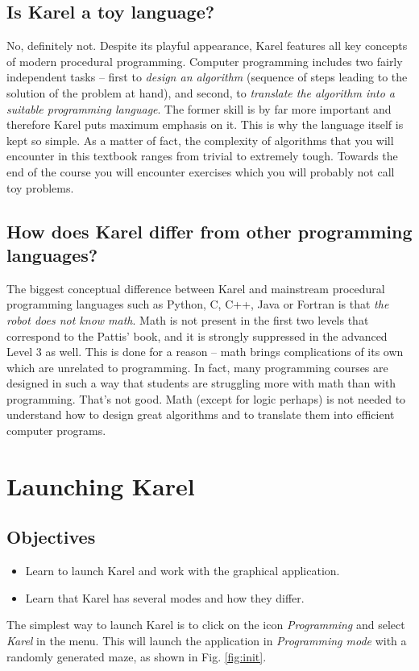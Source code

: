\subsection{Is Karel a toy language?}

No, definitely not. Despite its playful appearance, Karel features all key
concepts of modern procedural programming. Computer programming includes two 
fairly independent tasks -- first to {\em design an algorithm} (sequence of 
steps leading to the solution of the problem at hand), and second, to {\em translate 
the algorithm into a suitable programming language}. The former skill is by 
far more important and therefore Karel puts maximum emphasis on it. This is 
why the language itself is kept so simple. As a matter of fact, the complexity 
of algorithms that you will encounter in this textbook ranges from trivial  
to extremely tough. Towards the end of the course you will encounter exercises
which you will probably not call toy problems.

\subsection{How does Karel differ from other programming languages?}

The biggest conceptual difference between Karel and mainstream procedural
programming languages such as Python, C, C++, Java or Fortran is that {\em 
the robot does not know math}. Math is not present in the first two levels
that correspond to the Pattis' book, and it is strongly suppressed in the 
advanced Level 3 as well. This is done for a reason -- math brings complications of its own 
which are unrelated to programming. In fact, many programming courses are
designed in such a way that students are struggling more with math than with 
programming. That's not good. Math (except for logic perhaps) is not needed to understand 
how to design great algorithms and to translate them into efficient computer 
programs. 
 
\section{Launching Karel}

\subsection{Objectives} 
\begin{itemize}
\item Learn to launch Karel and work with the graphical application.
\item Learn that Karel has several modes and how they differ.
\end{itemize}
\noindent
The simplest way to launch Karel is to click on the icon 
{\em Programming} and select {\em Karel} in the menu. This will launch the application 
in {\em Programming mode} with a randomly generated maze, as shown in Fig. \ref{fig:init}.
\newpage

